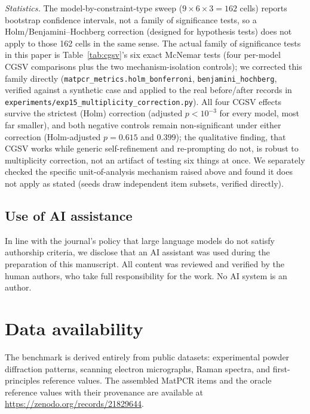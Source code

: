 \documentclass[pdflatex,sn-nature]{sn-jnl}
\begin{document}
\noindent\emph{Statistics.} The model-by-constraint-type sweep ($9\times6\times3=162$ cells)
reports bootstrap confidence intervals, not a family of significance tests, so a
Holm/Benjamini--Hochberg correction (designed for hypothesis tests) does not apply to those
162 cells in the same sense. The actual family of significance tests in this paper is
Table~\ref{tab:cgsv}'s six exact McNemar tests (four per-model CGSV comparisons plus the two
mechanism-isolation controls); we corrected this family directly
(\texttt{matpcr\_metrics.holm\_bonferroni}, \texttt{benjamini\_hochberg}, verified against a
synthetic case and applied to the real before/after records in
\texttt{experiments/exp15\_multiplicity\_correction.py}). All four CGSV effects survive the
strictest (Holm) correction (adjusted $p<10^{-3}$ for every model, most far smaller), and
both negative controls remain non-significant under either correction (Holm-adjusted
$p=0.615$ and $0.399$); the qualitative finding, that CGSV works while generic
self-refinement and re-prompting do not, is robust to multiplicity correction, not an
artifact of testing six things at once. We separately checked the specific unit-of-analysis
mechanism raised above and found it does not apply as stated (seeds draw independent item
subsets, verified directly).

\subsection*{Use of AI assistance}
In line with the journal's policy that large language models do not satisfy
authorship criteria, we disclose that an AI assistant was used during the preparation of
this manuscript. All content was reviewed and verified by the human authors, who take
full responsibility for the work. No AI system is an author.

\section*{Data availability}
The benchmark is derived entirely from public datasets: experimental powder diffraction
patterns,\cite{opxrd2025} scanning electron micrographs,\cite{aversa2018nffa} Raman
spectra,\cite{lafuente2015rruff} and first-principles reference values.\cite{matproj2013} The assembled MatPCR items and the oracle
reference values with their provenance are available at \url{https://zenodo.org/records/21829644}.
\end{document}

